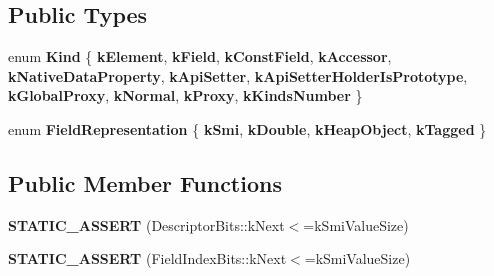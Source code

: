 \subsection*{Public Types}
\begin{DoxyCompactItemize}
\item 
\mbox{\label{classv8_1_1internal_1_1StoreHandler_a546c4b0b53313386243621e502962daf}} 
enum {\bfseries Kind} \{ \newline
{\bfseries k\+Element}, 
{\bfseries k\+Field}, 
{\bfseries k\+Const\+Field}, 
{\bfseries k\+Accessor}, 
\newline
{\bfseries k\+Native\+Data\+Property}, 
{\bfseries k\+Api\+Setter}, 
{\bfseries k\+Api\+Setter\+Holder\+Is\+Prototype}, 
{\bfseries k\+Global\+Proxy}, 
\newline
{\bfseries k\+Normal}, 
{\bfseries k\+Proxy}, 
{\bfseries k\+Kinds\+Number}
 \}
\item 
\mbox{\label{classv8_1_1internal_1_1StoreHandler_a0644c5db325acec966a84fb4d1de0556}} 
enum {\bfseries Field\+Representation} \{ {\bfseries k\+Smi}, 
{\bfseries k\+Double}, 
{\bfseries k\+Heap\+Object}, 
{\bfseries k\+Tagged}
 \}
\end{DoxyCompactItemize}
\subsection*{Public Member Functions}
\begin{DoxyCompactItemize}
\item 
\mbox{\label{classv8_1_1internal_1_1StoreHandler_a69d599ee27b93907a5acfa6c57b8419a}} 
{\bfseries S\+T\+A\+T\+I\+C\+\_\+\+A\+S\+S\+E\+RT} (Descriptor\+Bits\+::k\+Next$<$=k\+Smi\+Value\+Size)
\item 
\mbox{\label{classv8_1_1internal_1_1StoreHandler_a37d87a673fc3b0e98f432b137f248a37}} 
{\bfseries S\+T\+A\+T\+I\+C\+\_\+\+A\+S\+S\+E\+RT} (Field\+Index\+Bits\+::k\+Next$<$=k\+Smi\+Value\+Size)
\end{DoxyCompactItemize}
